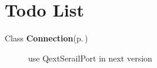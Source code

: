 \section{Todo List}\label{todo}
\label{todo__todo000001}
 \begin{description}
\item[Class {\bf Connection}{\rm (p.\,\pageref{classConnection})} ]use Qext\-Serail\-Port in next version \end{description}
